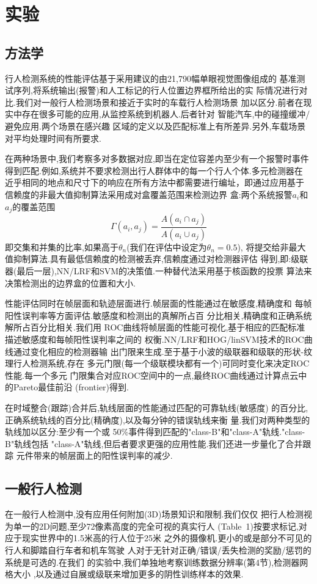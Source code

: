 \documentclass[10pt,letterpaper,journal,compsoc]{IEEEtran}
\begin{document}
\section{实验}
\subsection{方法学}
行人检测系统的性能评估基于采用建议的由21,790幅单眼视觉图像组成的
基准测试序列,将系统输出(报警)和人工标记的行人位置边界框所给出的实
际情况进行对比.我们对一般行人检测场景和接近于实时的车载行人检测场景
加以区分.前者在现实中存在很多可能的应用,从监控系统到机器人.后者针对
智能汽车\cite{bib20},\cite{bib23}中的碰撞缓冲/避免应用.两个场景在感兴趣
区域的定义以及匹配标准上有所差异.另外,车载场景对平均处理时间有所要求.

在两种场景中,我们考察多对多数据对应,即当在定位容差内至少有一个报警时事件
得到匹配.例如,系统并不要求检测出行人群体中的每一个行人个体.多元检测器在
近乎相同的地点和尺寸下的响应在所有方法中都需要进行编址，即通过应用基于
信赖度的非最大值抑制算法采用成对盒覆盖范围来检测边界
盒:两个系统报警$a_i$和$a_j$的覆盖范围
\[\Gamma(a_i,a_j)=\frac{A(a_i\cap{}a_j)}{A(a_i\cup{}a_j)}\]
即交集和并集的比率,如果高于$\theta_n$(我们在评估中设定为$\theta_n=0.5$),
将提交给非最大值抑制算法.具有最低信赖度的检测被丢弃,信赖度通过对检测器评估
得到,即:级联器(最后一层),NN/LRF和SVM的决策值.一种替代法采用基于核函数的投票
算法来决策检测出的边界盒的位置和大小\cite{bib10}.

性能评估同时在帧层面和轨迹层面进行.帧层面的性能通过在敏感度,精确度和
每帧阳性误判率等方面评估.敏感度和检测出的真解所占百
分比相关,精确度和正确系统解所占百分比相关.我们用
ROC曲线将帧层面的性能可视化,基于相应的匹配标准描述敏感度和每帧阳性误判率之间的
权衡.NN/LRF和HOG/linSVM技术的ROC曲线通过变化相应的检测器输
出门限来生成.至于基于小波的级联器和级联的形状-纹理行人检测系统,存在
多元门限(每一个级联模块都有一个)可同时变化来决定ROC性能.每一个多元
门限集合对应ROC空间中的一点,最终ROC曲线通过计算点云中的Pareto最佳前沿
(frontier)得到\cite{bib23}.

在时域整合(跟踪)合并后,轨线层面的性能通过匹配的可靠轨线(敏感度)
的百分比,正确系统轨线的百分比(精确度),以及每分钟的错误轨线来衡
量.我们对两种类型的轨线加以区分\cite{bib23}:至少有一个或
50\%事件得到匹配的"class-B"和"class-A"轨线."class-B"轨线包括
"class-A"轨线,但后者要求更强的应用性能.我们还进一步量化了合并跟踪
元件带来的帧层面上的阳性误判率的减少.
\subsection{一般行人检测}
在一般行人检测中,没有应用任何附加(3D)场景知识和限制.我们仅仅
把行人检测视为单一的2D问题,至少72像素高度的完全可视的真实行人
(Table~1)按要求标记,对应于现实世界中的1.5米高的行人位于25米
之外的摄像机.更小的或是部分不可见的行人和脚踏自行车者和机车驾驶
人对于无针对正确/错误/丢失检测的奖励/惩罚的系统是可选的.在我们
的实验中,我们单独地考察训练数据分辨率(第4节),检测器网格大小
,以及通过自展或级联来增加更多的阴性训练样本的效果.
\end{document}
